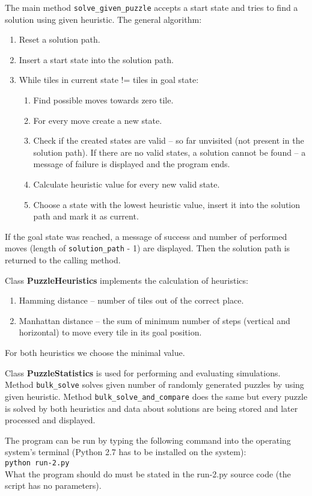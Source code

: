 \documentclass[a4paper]{article}
\begin{document}
The main method \verb|solve_given_puzzle| accepts a start state and tries to find a solution using given heuristic. The general algorithm:
\begin{enumerate}
\item Reset a solution path.
\item Insert a start state into the solution path.
\item While tiles in current state != tiles in goal state:
	\begin{enumerate}
	\item Find possible moves towards zero tile.
           \item For every move create a new state.
           \item Check if the created states are valid -- so far unvisited (not present in the solution path). If there are no valid states, a solution cannot be found -- a message of failure is displayed and the program ends.
           \item Calculate heuristic value for every new valid state.
           \item Choose a state with the lowest heuristic value, insert it into the solution path and mark it as current.
	\end{enumerate}
\end{enumerate}

If the goal state was reached, a message of success and number of performed moves (length of \texttt{solution\_path} - 1) are displayed. Then the solution path is returned to the calling method.

Class \textbf{PuzzleHeuristics} implements the calculation of heuristics:
\begin{enumerate}
\item Hamming distance -- number of tiles out of the correct place.
\item Manhattan distance -- the sum of minimum number of steps (vertical and horizontal) to move every tile in its goal position.
\end{enumerate}
For both heuristics we choose the minimal value. 

Class \textbf{PuzzleStatistics} is used for performing and evaluating simulations. Method \texttt{bulk\_solve} solves given number of randomly generated puzzles by using given heuristic. Method \verb|bulk_solve_and_compare| does the same but every puzzle is solved by both heuristics and data about solutions are being stored and later processed and displayed. 

The program can be run by typing the following command into the operating system's terminal (Python 2.7 has to be installed on the system): \\ 
\verb|python run-2.py| \\
What the program should do must be stated in the run-2.py source code (the script has no parameters).
\end{document}
